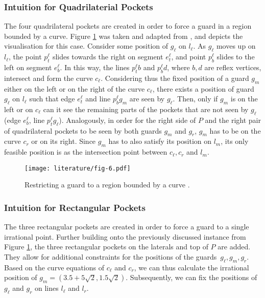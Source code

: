 \subsubsection{Intuition for Quadrilaterial Pockets}
The four quadrilateral pockets are created in order to force a guard in a region bounded by a curve. Figure \ref{fig:quadrilateral_pockets} was taken and adapted from \cite{1057165}, and depicts the visualisation for this case. 
Consider some position of $g_{\ell}$ on $l_{\ell}$. As $g_{\ell}$ moves up on $l_{\ell}$, the point $p^{\ell}_t$ slides towards the right on segment $e^{\ell}_t$, and point $p^{\ell}_b$ slides to the left on segment $e^{\ell}_b$. In this way, the lines $p^{\ell}_tb$ and $p^{\ell}_bd$, where $b, d$ are reflex vertices, intersect and form the curve $c_{\ell}$. Considering thus the fixed position of a guard $g_m$ either on the left or on the right of the curve $c_\ell$, there exists a position of guard $g_{\ell}$ on $l_{\ell}$ such that edge $e_t^{\ell}$ and line $p_b^{\ell}g_m$ are seen by $g_\ell$. Then, only if $g_m$ is on the left or on $c_\ell$ can it see the remaining parts of the pockets that are not seen by $g_\ell$ (edge $e_b^{\ell}$, line $p_t^{\ell}g_{\ell}$). Analogously, in order for the right side of $P$ and the right pair of quadrilateral pockets to be seen by both guards $g_m$ and $g_r$, $g_m$ has to be on the curve $c_r$ or on its right. Since $g_m$ has to also satisfy its position on $l_m$, its only feasible position is as the intersection point between $c_\ell, c_r$ and $l_m$. 

\begin{figure}[h!]
    \centering
    \texttt{[image: literature/fig-6.pdf]}
    \caption{Restricting a guard to a region bounded by a curve \cite{1057165}.}
    \label{fig:quadrilateral_pockets}
\end{figure}

\subsubsection{Intuition for Rectangular Pockets}
The three rectangular pockets are created in order to force a guard to a single irrational point. Further building onto the previously discussed instance from Figure \ref{fig:quadrilateral_pockets}, the three rectangular pockets on the laterals and top of $P$ are added.  They allow for additional constraints for the positions of the guards~$g_\ell, g_m, g_r$. Based on the curve equations of $c_\ell$ and $c_r$, we can thus calculate the irrational position of $g_m = (3.5 + 5\sqrt 2, 1.5\sqrt 2)$. Subsequently, we can fix the positions of $g_\ell$ and $g_r$ on lines $l_\ell$ and $l_r$.

